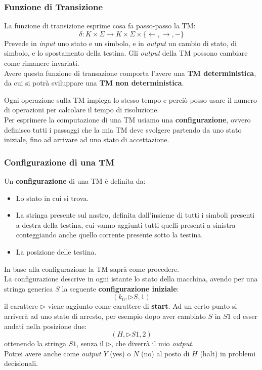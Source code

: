 \subsubsection{Funzione di Transizione}
\begin{definizione}
  La funzione di transizione esprime cosa fa passo-passo la TM:
  \[\delta:K\times\Sigma\to K\times \Sigma\times\{\leftarrow,\rightarrow,-\}\]
  Prevede in \textit{input} uno stato e un simbolo, e in \textit{output} un cambio
  di stato, di simbolo, e lo spostamento della testina. 
  Gli \textit{output} della TM possono cambiare come rimanere invariati.\\
  Avere questa funzione di transazione comporta l'avere una
  \textbf{TM deterministica}, da cui si potrà sviluppare una \textbf{TM non
    deterministica}.
\end{definizione}
Ogni operazione sulla TM impiega lo stesso tempo e perciò posso usare il numero di
operazioni per calcolare il tempo di risoluzione.\\
Per esprimere la computazione di una TM usiamo una \textbf{configurazione},
ovvero definisco tutti i passaggi che la mia TM deve svolgere partendo da uno stato iniziale, 
fino ad arrivare ad uno stato di accettazione.

\subsubsection{Configurazione di una TM}
\begin{definizione}
  Un \textbf{configurazione} di una TM è definita da:
  \begin{itemize}
    \item Lo stato in cui si trova.
    \item La stringa presente sul nastro, definita dall'insieme di tutti i simboli presenti a destra della testina, cui vanno aggiunti tutti quelli presenti a sinistra conteggiando anche quello corrente presente sotto la testina. 
    \item La posizione delle testina. 
  \end{itemize}
  In base alla configurazione la TM saprà come procedere.\\
  La configurazione descrive in ogni istante lo stato della macchina, avendo per una stringa generica $S$ la seguente \textbf{configurazione iniziale}:
  \[(k_0,\triangleright S, 1)\]
  il carattere $\triangleright$ viene aggiunto come carattere di \textbf{start}.
  Ad un certo punto si arriverà ad uno stato di arresto, per esempio dopo
  aver cambiato $S$ in $S1$ ed esser andati nella posizione due:
  \[(H,\triangleright S1, 2)\]
  ottenendo la stringa $S1$, senza il $\triangleright$, che diverrà il mio \textit{output}.\\
  Potrei avere anche come \textit{output} $Y$ (yes) o $N$ (no) al posto di $H$ (halt) in problemi decisionali.
\end{definizione}
